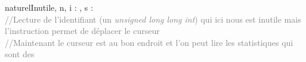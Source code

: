 \begin{algorithme}
    {naturelInutile, n, i : \naturel , s : \statistiques}
    {
    	\\
    	\textcolor{gray}{//Lecture de l'identifiant (un \textit{unsigned long long int}) qui ici nous est inutile mais l'instruction permet de déplacer le curseur}
		\\
    	\textcolor{gray}{//Maintenant le curseur est au bon endroit et l'on peut lire les statistiques qui sont des \naturel}
    	{
    	}
    }
\end{algorithme}
